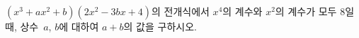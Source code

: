 $(x^3+ax^2+b)(2x^2-3bx+4)$의 전개식에서 $x^4$의 계수와 $x^2$의 계수가 모두 $8$일 때, 상수~$a$, $b$에 대하여 $a+b$의 값을 구하시오.
